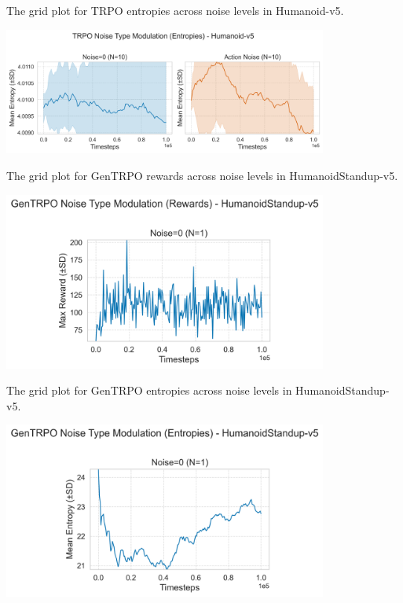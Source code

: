 \documentclass{svproc}
\begin{document}
The grid plot for TRPO entropies across noise levels in Humanoid-v5.

\begin{center}
\includegraphics[width=0.8\textwidth]{graph_Humanoid-v5_TRPO_noise_mod_entropies_grid.png}
\end{center}

The grid plot for GenTRPO rewards across noise levels in HumanoidStandup-v5.

\begin{center}
\includegraphics[width=0.8\textwidth]{graph_HumanoidStandup-v5_GenTRPO_noise_mod_rewards_grid.png}
\end{center}

The grid plot for GenTRPO entropies across noise levels in HumanoidStandup-v5.

\begin{center}
\includegraphics[width=0.8\textwidth]{graph_HumanoidStandup-v5_GenTRPO_noise_mod_entropies_grid.png}
\end{center}
\end{document}
